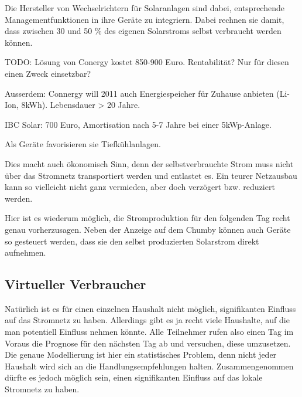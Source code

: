 \documentclass[12pt,BCOR=8.5mm]{scrartcl}
\begin{document}
Die Hersteller von Wechselrichtern für Solaranlagen sind dabei,
entsprechende Managementfunktionen in ihre Geräte zu integriern. Dabei
rechnen sie damit, dass zwischen 30 und 50 \% des eigenen Solarstroms
selbst verbraucht werden können\cite{ossenbrinck10herstellung}.

TODO: Lösung von Conergy kostet 850-900 Euro. Rentabilität? Nur für
diesen einen Zweck einsetzbar?

Ausserdem: Connergy will 2011 auch Energiespeicher für Zuhause anbieten
(Li-Ion, 8kWh). Lebensdauer > 20 Jahre.

IBC Solar: 700 Euro, Amortisation nach 5-7 Jahre bei einer 5kWp-Anlage.

Als Geräte favorisieren sie Tiefkühlanlagen.

Dies macht auch
ökonomisch Sinn, denn der selbstverbrauchte Strom muss nicht über das
Stromnetz transportiert werden und entlastet es. Ein teurer Netzausbau
kann so vielleicht nicht ganz vermieden, aber doch verzögert bzw.
reduziert werden.

Hier ist es wiederum möglich, die Stromproduktion für den folgenden Tag
recht genau vorherzusagen. Neben der Anzeige auf dem Chumby können auch
Geräte so gesteuert werden, dass sie den selbst produzierten Solarstrom
direkt aufnehmen.

\subsection{Virtueller Verbraucher}\label{sub:virtuellerverbraucher}
Natürlich ist es für einen einzelnen Haushalt nicht möglich,
signifikanten Einfluss auf das Stromnetz zu haben. Allerdings gibt es ja
recht viele Haushalte, auf die man potentiell Einfluss nehmen könnte.
Alle Teilnehmer rufen also einen Tag im Voraus die Prognose für den
nächsten Tag ab und versuchen, diese umzusetzen. Die genaue Modellierung
ist hier ein statistisches Problem, denn nicht jeder Haushalt wird sich
an die Handlungsempfehlungen halten. Zusammengenommen dürfte es jedoch
möglich sein, einen signifikanten Einfluss auf das lokale Stromnetz zu
haben.
\end{document}
